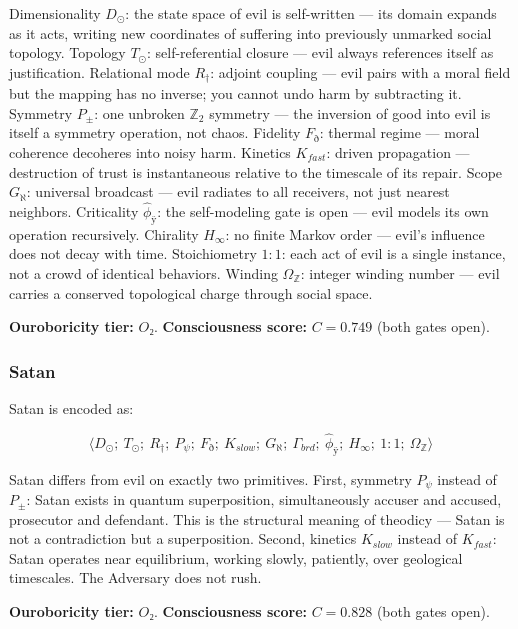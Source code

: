 \documentclass[12pt,a4paper]{article}
\begin{document}
Dimensionality $D_{\odot}$: the state space of evil is self-written --- its domain expands as it acts, writing new coordinates of suffering into previously unmarked social topology. Topology $T_{\odot}$: self-referential closure --- evil always references itself as justification. Relational mode $R_{\dagger}$: adjoint coupling --- evil pairs with a moral field but the mapping has no inverse; you cannot undo harm by subtracting it. Symmetry $P_{\pm}$: one unbroken $\mathbb{Z}_2$ symmetry --- the inversion of good into evil is itself a symmetry operation, not chaos. Fidelity $F_{\eth}$: thermal regime --- moral coherence decoheres into noisy harm. Kinetics $K_{fast}$: driven propagation --- destruction of trust is instantaneous relative to the timescale of its repair. Scope $G_{\aleph}$: universal broadcast --- evil radiates to all receivers, not just nearest neighbors. Criticality $\hat{\phi}_{ÿ}$: the self-modeling gate is open --- evil models its own operation recursively. Chirality $H_{\infty}$: no finite Markov order --- evil's influence does not decay with time. Stoichiometry $1{:}1$: each act of evil is a single instance, not a crowd of identical behaviors. Winding $\Omega_\mathbb{Z}$: integer winding number --- evil carries a conserved topological charge through social space.

\textbf{Ouroboricity tier:} $O₂$. \textbf{Consciousness score:} $C = 0.749$ (both gates open).

\subsubsection{Satan}

Satan is encoded as:


\[\langle D_{\odot};\ T_{\odot};\ R_{\dagger};\ P_{\psi};\ F_{\eth};\ K_{slow};\ G_{\aleph};\ \Gamma_{brd};\ \hat{\phi}_{ÿ};\ H_{\infty};\ 1{:}1;\ \Omega_{\mathbb{Z}} \rangle\]

Satan differs from evil on exactly two primitives. First, symmetry $P_{\psi}$ instead of $P_{\pm}$: Satan exists in quantum superposition, simultaneously accuser and accused, prosecutor and defendant. This is the structural meaning of theodicy --- Satan is not a contradiction but a superposition. Second, kinetics $K_{slow}$ instead of $K_{fast}$: Satan operates near equilibrium, working slowly, patiently, over geological timescales. The Adversary does not rush.

\textbf{Ouroboricity tier:} $O₂$. \textbf{Consciousness score:} $C = 0.828$ (both gates open).
\end{document}
